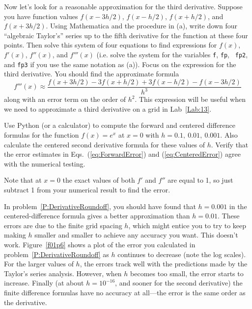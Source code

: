 \begin{enumerate}
\begin{enumerate}
    Now let's look for a reasonable approximation for the
    third derivative. Suppose you have function values
    $f(x-3h/2)$, $f(x-h/2)$, $f(x+h/2)$, and $f(x+3h/2)$.
    Using Mathematica and the procedure in (a), write down
    four ``algebraic Taylor's'' series up to the fifth
    derivative for the function at these four points. Then
    solve this system of four equations to find expressions
    for $f(x)$, $f'(x)$, $f''(x)$, and $f'''(x)$ (i.e. solve
    the system for the variables {\tt f}, {\tt fp}, {\tt
    fp2}, and {\tt fp3} if you use the same notation as (a)).
    Focus on the expression for the third derivative.  You
    should find the approximate formula
    \begin{equation}\label{eq:thirdDeriv}
        f'''(x) \approx
        \frac{f(x+3h/2) - 3 f(x+h/2) + 3 f(x-h/2) - f(x-3h/2)}{h^3}
    \end{equation}
    along with an error term on the order of $h^2$.  This
    expression will be useful when we need to approximate a
    third derivative on a grid in Lab~\ref{Lab:13}.
\end{enumerate}


\prob \label{P:DerivativeRoundoff} Use Python (or a calculator)
    to compute the forward and centered difference formulas for
    the function $f(x)=e^x$ at $x=0$ with $h=0.1,~0.01,~0.001$.
    Also calculate the centered second derivative formula for
    these values of $h$. Verify that the error estimates in
    Eqs.~(\ref{eq:ForwardError}) and (\ref{eq:CenteredError})
    agree with the numerical testing.

    Note that at $x=0$ the exact values of both $f'$ and $f''$
    are equal to 1, so just subtract 1 from your numerical result
    to find the error.
\end{enumerate}

In problem~\ref{P:DerivativeRoundoff}, you should have found that
$h=0.001$ in the centered-difference formula gives a better
approximation than $h=0.01$.  These errors are due to the finite
grid spacing $h$, which might entice you to try to keep making $h$
smaller and smaller to achieve any accuracy you want. This doesn't
work. Figure~\ref{f01p6} shows a plot of the error you calculated
in problem~\ref{P:DerivativeRoundoff} as $h$ continues to decrease
(note the log scales). For the larger values of $h$, the errors
track well with the predictions made by the Taylor's series
analysis. However, when $h$ becomes too small, the error starts to
increase. Finally (at about $h=10^{-16}$, and sooner for the second
derivative) the finite difference formulas have no accuracy at
all---the error is the same order as the derivative.

